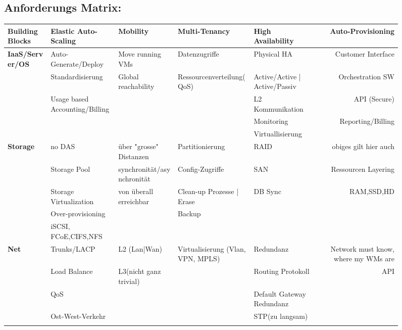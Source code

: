 \documentclass[a4,12pt]{scrartcl}
\begin{document}
\begin{landscape}
\begin{figure}[htbp]
\subsection{Anforderungs Matrix:}
\begin{center}
\begin{adjustbox}{max width=600px}
    \begin{tabular}{@{} l l l l l r@{}}\toprule    
    {\textbf{Building Blocks}} & {\textbf{Elastic Auto-Scaling}} & {\textbf{Mobility}} & {\textbf{Multi-Tenancy}} & {\textbf{High Availability}} & {\textbf{Auto-Provisioning}}\\ \midrule
    \textbf{IaaS/Server/OS} & Auto-Generate/Deploy & Move running VMs & Datenzugriffe & Physical HA & Customer Interface\\ \addlinespace
    & Standardisierung & Global reachability & Ressourcenverteilung(QoS) & Active/Active  | Active/Passiv & Orchestration SW\\ \addlinespace
        & Usage based Accounting/Billing & & & L2 Kommunikation & API (Secure)\\ \addlinespace
		& & & & Monitoring & Reporting/Billing \\ \addlinespace
		& & & & Virtuallisierung & \\ \addlinespace
    \textbf{Storage} & no DAS & über "grosse" Distanzen & Partitionierung & RAID & obiges gilt hier auch\\ \addlinespace
	& Storage Pool & synchronität/asynchronität & Config-Zugriffe & SAN & Ressourcen Layering \\ \addlinespace
	& Storage Virtualization & von überall erreichbar & Clean-up Prozesse | Erase & DB Sync & RAM,SSD,HD \\ \addlinespace
	& Over-provisioning & & Backup & & \\ \addlinespace
	& iSCSI, FCoE,CIFS,NFS & & & & \\ \addlinespace
	\textbf{Net} & Trunks/LACP & L2 (Lan|Wan) & Virtualisierung (Vlan, VPN, MPLS) & Redundanz & Network must know, where my WMs are \\ \addlinespace
	& Load Balance & L3(nicht ganz trivial) & & Routing Protokoll & API \\ \addlinespace
	& QoS & & & Default Gateway Redundanz & \\ \addlinespace
	& Ost-West-Verkehr & & & STP(zu langsam) & \\ \addlinespace

\end{tabular}
\end{adjustbox}
\end{center}
\end{figure}
\end{landscape}
\end{document}
